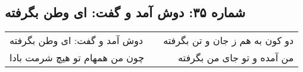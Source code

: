 \begin{center}
\section*{شماره ۳۵: دوش آمد و گفت: ای وطن بگرفته}
\label{sec:035}
\begin{longtable}{l p{0.5cm} r}
دوش آمد و گفت: ای وطن بگرفته
&&
دو کون به هم ز جان و تن بگرفته
\\
چون من همهام تو هیچ شرمت بادا
&&
من آمده و تو جای من بگرفته
\\
\end{longtable}
\end{center}
